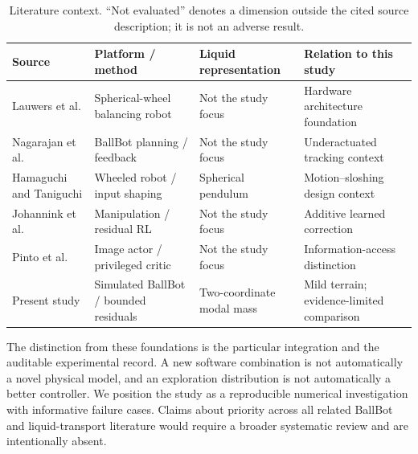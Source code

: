 \begin{table}[t]\centering\small
\caption{Literature context. ``Not evaluated'' denotes a dimension outside the cited source description; it is not an adverse result.}
\begin{tabular}{llll}\hline
Source & Platform / method & Liquid representation & Relation to this study\\\hline
Lauwers et al. & Spherical-wheel balancing robot & Not the study focus & Hardware architecture foundation\\
Nagarajan et al. & BallBot planning / feedback & Not the study focus & Underactuated tracking context\\
Hamaguchi and Taniguchi & Wheeled robot / input shaping & Spherical pendulum & Motion--sloshing design context\\
Johannink et al. & Manipulation / residual RL & Not the study focus & Additive learned correction\\
Pinto et al. & Image actor / privileged critic & Not the study focus & Information-access distinction\\
Present study & Simulated BallBot / bounded residuals & Two-coordinate modal mass & Mild terrain; evidence-limited comparison\\\hline
\end{tabular}\end{table}

The distinction from these foundations is the particular integration and the auditable experimental record. A new software combination is not automatically a novel physical model, and an exploration distribution is not automatically a better controller. We position the study as a reproducible numerical investigation with informative failure cases. Claims about priority across all related BallBot and liquid-transport literature would require a broader systematic review and are intentionally absent.
